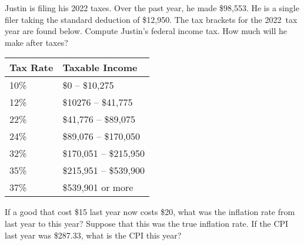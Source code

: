 \documentclass[11pt,letterpaper]{article}
\begin{document}

 Justin is filing his 2022 taxes. Over the past year, he made \$98,553. He is a single filer taking the standard deduction of \$12,950. The tax brackets for the 2022~tax year are found below. Compute Justin's federal income tax. How much will he make after taxes?  \par
	\begin{table}[!ht]
	\centering
	\begin{tabular}{|l|l|} \hline
	Tax Rate & Taxable Income \\ \hline
	10\% & \$0 -- \$10,275 \\ \hline
	12\% & \$10276 -- \$41,775 \\ \hline
	22\% & \$41,776 -- \$89,075 \\ \hline
	24\% & \$89,076 -- \$170,050 \\ \hline
	32\% & \$170,051 -- \$215,950 \\ \hline
	35\% & \$215,951 -- \$539,900 \\ \hline
	37\% & \$539,901 or more \\ \hline
	\end{tabular}
	\end{table}



\newpage



 If a good that cost \$15 last year now costs \$20, what was the inflation rate from last year to this year? Suppose that this was the true inflation rate. If the CPI last year was \$287.33, what is the CPI this year?
\end{document}
